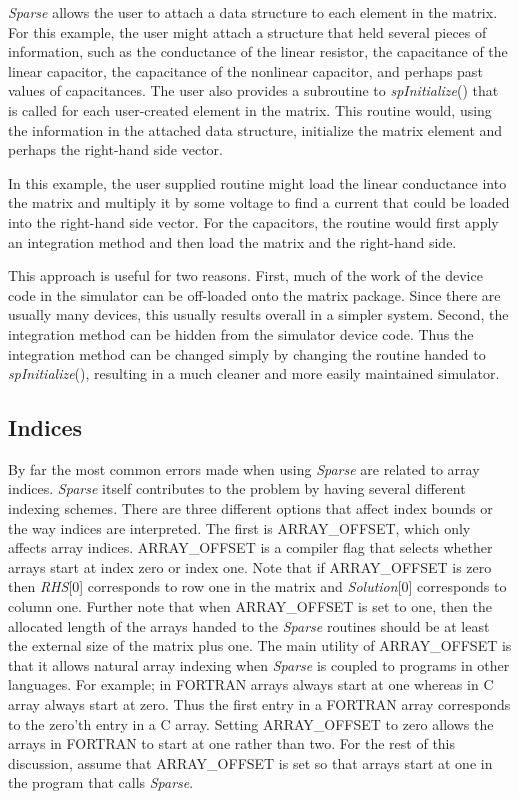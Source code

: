 \documentclass[11pt]{article}
\begin{document}
\emph{Sparse} allows the user to attach a data structure to each element
in the matrix.  For this example, the user might attach a structure
that held several pieces of information, such as the conductance of the
linear resistor, the capacitance of the linear capacitor, the
capacitance of the nonlinear capacitor, and perhaps past values of
capacitances.  The user also provides a subroutine to
\emph{spInitialize}() that is called for each user-created element in the
matrix.  This routine would, using the information in the attached data
structure, initialize the matrix element and perhaps the right-hand
side vector.

In this example, the user supplied routine might load the linear
conductance into the matrix and multiply it by some voltage to find a
current that could be loaded into the right-hand side vector.  For the
capacitors, the routine would first apply an integration method and
then load the matrix and the right-hand side.

This approach is useful for two reasons.  First, much of the work of
the device code in the simulator can be off-loaded onto the matrix
package.  Since there are usually many devices, this usually results
overall in a simpler system.  Second, the integration method can be
hidden from the simulator device code.  Thus the integration method can
be changed simply by changing the routine handed to \emph{spInitialize}(),
resulting in a much cleaner and more easily maintained simulator.

\subsection{Indices}
By far the most common errors made when using \emph{Sparse} are related
to array indices.  \emph{Sparse} itself contributes to the problem by
having several different indexing schemes.  There are three different
options that affect index bounds or the way indices are interpreted.
The first is ARRAY\_OFFSET, which only affects array indices.
ARRAY\_OFFSET is a compiler flag that selects whether arrays start at
index zero or index one.  Note that if ARRAY\_OFFSET is zero then
\emph{RHS}[0] corresponds to row one in the matrix and \emph{Solution}[0]
corresponds to column one.  Further note that when ARRAY\_OFFSET is set
to one, then the allocated length of the arrays handed to the
\emph{Sparse} routines should be at least the external size of the matrix
plus one.  The main utility of ARRAY\_OFFSET is that it allows natural
array indexing when \emph{Sparse} is coupled to programs in other
languages.  For example; in FORTRAN arrays always start at one whereas
in C array always start at zero.  Thus the first entry in a FORTRAN
array corresponds to the zero'th entry in a C array.  Setting
ARRAY\_OFFSET to zero allows the arrays in FORTRAN to start at one rather
than two.  For the rest of this discussion, assume that ARRAY\_OFFSET is
set so that arrays start at one in the program that calls \emph{Sparse}.
\end{document}
